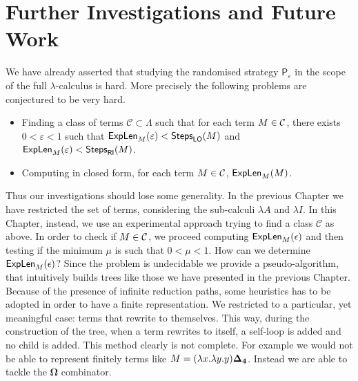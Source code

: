 \chapter{Further Investigations and Future Work}
We have already asserted that studying the randomised strategy $\mathsf{P}_\varepsilon$ in the scope of the full $\lambda$-calculus is hard. More precisely the following problems are conjectured to be very hard.
\begin{itemize}
	\item Finding a class of terms $\mathcal{C}\subset\Lambda$ such that for each term $M\in\mathcal{C}$, there exists $0<\varepsilon<1$ such that $\textsf{ExpLen}_{M}(\varepsilon)<\textsf{Steps}_{\textsf{LO}}(M)$ and $\textsf{ExpLen}_{M}(\varepsilon)<\textsf{Steps}_{\textsf{RI}}(M)$.
	\item Computing in closed form, for each term $M\in\mathcal{C}$, $\textsf{ExpLen}_{M}(M)$.
\end{itemize}
Thus our investigations should lose some generality. In the previous Chapter we have restricted the set of terms, considering the sub-calculi $\lambda A$ and $\lambda I$. In this Chapter, instead, we use an experimental approach trying to find a class $\mathcal{C}$ as above. In order to check if $M\in\mathcal{C}$, we proceed computing $\textsf{ExpLen}_{M}(\epsilon)$ and then testing if the minimum $\mu$ is such that $0<\mu<1$. How can we determine $\textsf{ExpLen}_{M}(\epsilon)$? Since the problem is undecidable we provide a pseudo-algorithm, that intuitively builds trees like those we have presented in the previous Chapter. Because of the presence of infinite reduction paths, some heuristics has to be adopted in order to have a finite representation. We restricted to a particular, yet meaningful case: terms that rewrite to themselves. This way, during the construction of the tree, when a term rewrites to itself, a self-loop is added and no child is added. This method clearly is not complete. For example we would not be able to represent finitely terms like $M = (\lambda x.\lambda y.y)\bm{\Delta_4}$. Instead we are able to tackle the $\bm{\Omega}$ combinator.
